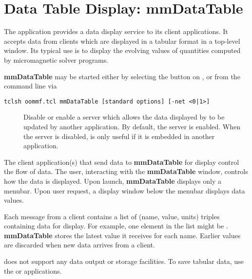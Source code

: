 \chapter{Data Table Display: mmDataTable}\label{sec:mmdatatable}%

\begin{center}
\end{center}

The application  provides a data display service to its
client applications.  It accepts data from clients which are displayed in
a tabular format in a top-level window.  Its typical use is to display
the evolving values of quantities computed by micromagnetic solver
programs.

{\bf mmDataTable} may be started either by selecting the
 button on ,
or from the command line via
\begin{verbatim}
tclsh oommf.tcl mmDataTable [standard options] [-net <0|1>]
\end{verbatim}

\begin{description}
\item[]
  Disable or enable a server which allows the data displayed by
   to be updated by another application.
  By default, the server is enabled.  When the server is disabled,
   is only useful if it is embedded in another application.
\end{description}

The client application(s) that send data to {\bf mmDataTable} for 
display control the flow of data.  The user, interacting with
the {\bf mmDataTable} window, controls how the data is displayed.
Upon launch, {\bf mmDataTable} displays only a menubar.  Upon user
request, a display window below the menubar displays data values.

Each message from a client contains a list of
(name, value, units) triples containing data for display.  
For example, one element in the list might be 
.  {\bf mmDataTable}
stores the latest value it receives for each name.  Earlier
values are discarded when new data arrives from a client.

 does not support any data output or storage
facilities.  To save tabular data, use the
or
 applications.

